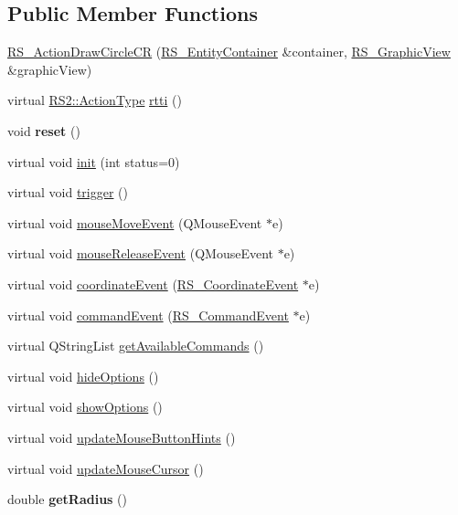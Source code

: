 \subsection*{Public Member Functions}
\begin{DoxyCompactItemize}
\item 
\hyperlink{classRS__ActionDrawCircleCR_a4f9b4e5b20092665f5ba50b3ad41683c}{R\-S\-\_\-\-Action\-Draw\-Circle\-C\-R} (\hyperlink{classRS__EntityContainer}{R\-S\-\_\-\-Entity\-Container} \&container, \hyperlink{classRS__GraphicView}{R\-S\-\_\-\-Graphic\-View} \&graphic\-View)
\item 
virtual \hyperlink{classRS2_afe3523e0bc41fd637b892321cfc4b9d7}{R\-S2\-::\-Action\-Type} \hyperlink{classRS__ActionDrawCircleCR_a02832f9fc9595a56d5a39a97262b899e}{rtti} ()
\item 
\hypertarget{classRS__ActionDrawCircleCR_a5a490dc88cd29d9ea81ca9bde4cfe136}{void {\bfseries reset} ()}\label{classRS__ActionDrawCircleCR_a5a490dc88cd29d9ea81ca9bde4cfe136}

\item 
virtual void \hyperlink{classRS__ActionDrawCircleCR_a11ffb91ada314a450349d631efedb188}{init} (int status=0)
\item 
virtual void \hyperlink{classRS__ActionDrawCircleCR_aa115d8f8280ddcb0c010f3be15131063}{trigger} ()
\item 
virtual void \hyperlink{classRS__ActionDrawCircleCR_aef1cd20fd696f99339a547df143becf8}{mouse\-Move\-Event} (Q\-Mouse\-Event $\ast$e)
\item 
virtual void \hyperlink{classRS__ActionDrawCircleCR_ab9a14366c353a9035a56b366a4e3283b}{mouse\-Release\-Event} (Q\-Mouse\-Event $\ast$e)
\item 
virtual void \hyperlink{classRS__ActionDrawCircleCR_a13763b7e64f95d0dbaaa74c741de4010}{coordinate\-Event} (\hyperlink{classRS__CoordinateEvent}{R\-S\-\_\-\-Coordinate\-Event} $\ast$e)
\item 
virtual void \hyperlink{classRS__ActionDrawCircleCR_a61526470d1f83a95b392098149def7a1}{command\-Event} (\hyperlink{classRS__CommandEvent}{R\-S\-\_\-\-Command\-Event} $\ast$e)
\item 
virtual Q\-String\-List \hyperlink{classRS__ActionDrawCircleCR_a00e25173679b0563a00e11d7c2160929}{get\-Available\-Commands} ()
\item 
virtual void \hyperlink{classRS__ActionDrawCircleCR_acfbb1d0a411a070c33d8ff6c51363b86}{hide\-Options} ()
\item 
virtual void \hyperlink{classRS__ActionDrawCircleCR_a42432b8ee30c3785e18682c5b2b08bcf}{show\-Options} ()
\item 
virtual void \hyperlink{classRS__ActionDrawCircleCR_a10cffa2d931f67e596274ebfa366241e}{update\-Mouse\-Button\-Hints} ()
\item 
virtual void \hyperlink{classRS__ActionDrawCircleCR_a714379f767ce2cd19594ec0e43073a9d}{update\-Mouse\-Cursor} ()
\item 
\hypertarget{classRS__ActionDrawCircleCR_a35ed90309923e1f846301444878889d8}{double {\bfseries get\-Radius} ()}\label{classRS__ActionDrawCircleCR_a35ed90309923e1f846301444878889d8}


\end{DoxyCompactItemize}
